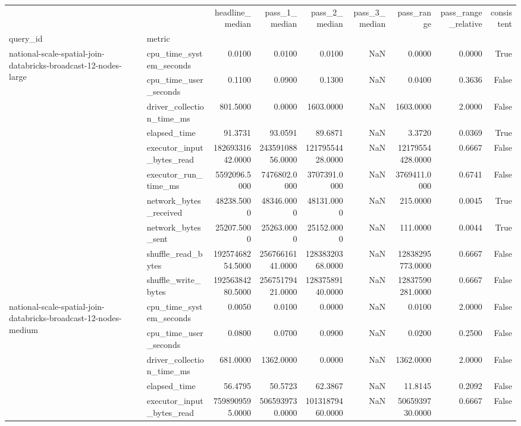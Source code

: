 \begin{tabular}{llrrrrrrr}
\toprule
 &  & headline\_median & pass\_1\_median & pass\_2\_median & pass\_3\_median & pass\_range & pass\_range\_relative & consistent \\
query\_id & metric &  &  &  &  &  &  &  \\
\midrule
\multirow[t]{10}{*}{national-scale-spatial-join-databricks-broadcast-12-nodes-large} & cpu\_time\_system\_seconds & 0.0100 & 0.0100 & 0.0100 & NaN & 0.0000 & 0.0000 & True \\
 & cpu\_time\_user\_seconds & 0.1100 & 0.0900 & 0.1300 & NaN & 0.0400 & 0.3636 & False \\
 & driver\_collection\_time\_ms & 801.5000 & 0.0000 & 1603.0000 & NaN & 1603.0000 & 2.0000 & False \\
 & elapsed\_time & 91.3731 & 93.0591 & 89.6871 & NaN & 3.3720 & 0.0369 & True \\
 & executor\_input\_bytes\_read & 18269331642.0000 & 24359108856.0000 & 12179554428.0000 & NaN & 12179554428.0000 & 0.6667 & False \\
 & executor\_run\_time\_ms & 5592096.5000 & 7476802.0000 & 3707391.0000 & NaN & 3769411.0000 & 0.6741 & False \\
 & network\_bytes\_received & 48238.5000 & 48346.0000 & 48131.0000 & NaN & 215.0000 & 0.0045 & True \\
 & network\_bytes\_sent & 25207.5000 & 25263.0000 & 25152.0000 & NaN & 111.0000 & 0.0044 & True \\
 & shuffle\_read\_bytes & 19257468254.5000 & 25676616141.0000 & 12838320368.0000 & NaN & 12838295773.0000 & 0.6667 & False \\
 & shuffle\_write\_bytes & 19256384280.5000 & 25675179421.0000 & 12837589140.0000 & NaN & 12837590281.0000 & 0.6667 & False \\
\cline{1-9}
\multirow[t]{10}{*}{national-scale-spatial-join-databricks-broadcast-12-nodes-medium} & cpu\_time\_system\_seconds & 0.0050 & 0.0100 & 0.0000 & NaN & 0.0100 & 2.0000 & False \\
 & cpu\_time\_user\_seconds & 0.0800 & 0.0700 & 0.0900 & NaN & 0.0200 & 0.2500 & False \\
 & driver\_collection\_time\_ms & 681.0000 & 1362.0000 & 0.0000 & NaN & 1362.0000 & 2.0000 & False \\
 & elapsed\_time & 56.4795 & 50.5723 & 62.3867 & NaN & 11.8145 & 0.2092 & False \\
 & executor\_input\_bytes\_read & 7598909595.0000 & 5065939730.0000 & 10131879460.0000 & NaN & 5065939730.0000 & 0.6667 & False \\

\end{tabular}
